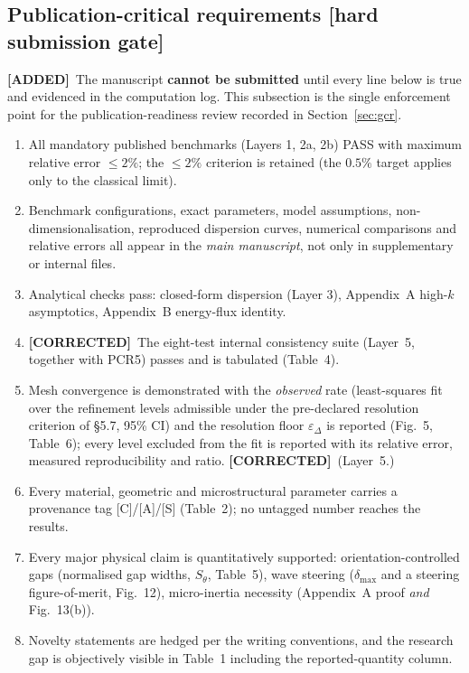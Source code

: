 \documentclass[11pt,a4paper]{article}
\newcommand{\bp}[1]{\textcolor{accent}{\textsf{\footnotesize [#1]}}}
\newcommand{\ADDED}{{\color{addcol}\textbf{[ADDED]}}}
\newcommand{\COR}{{\color{corcol}\textbf{[CORRECTED]}}}
\begin{document}
\subsection{Publication-critical requirements \bp{hard submission gate}}
\label{sec:pcr}

\ADDED\ The manuscript \textbf{cannot be submitted} until every line below is true and
evidenced in the computation log. This subsection is the single enforcement point for
the publication-readiness review recorded in Section~\ref{sec:gcr}.

\begin{enumerate}[label=\textbf{PCR\arabic*.}]
\item All mandatory published benchmarks (Layers 1, 2a, 2b) PASS with maximum relative
error $\le2\%$; the $\le2\%$ criterion is retained (the $0.5\%$ target applies only to the
classical limit).
\item Benchmark configurations, exact parameters, model assumptions, non-dimensionalisation,
reproduced dispersion curves, numerical comparisons and relative errors all appear in the
\emph{main manuscript}, not only in supplementary or internal files.
\item Analytical checks pass: closed-form dispersion (Layer 3), Appendix~A high-$k$
asymptotics, Appendix~B energy-flux identity.
\item \COR\ The eight-test internal consistency suite (Layer~5, together with PCR5) passes and is tabulated (Table~4).
\item Mesh convergence is demonstrated with the \emph{observed} rate (least-squares fit over the refinement levels admissible under the pre-declared resolution criterion of \S5.7, 95\% CI) and the resolution floor $\varepsilon_\Delta$ is reported (Fig.~5, Table~6); every level excluded from the fit is reported with its relative error, measured reproducibility and ratio. \COR\ (Layer~5.)
\item Every material, geometric and microstructural parameter carries a provenance tag
[C]/[A]/[S] (Table~2); no untagged number reaches the results.
\item Every major physical claim is quantitatively supported: orientation-controlled gaps
(normalised gap widths, $S_\theta$, Table~5), wave steering ($\delta_{\max}$ and a steering
figure-of-merit, Fig.~12), micro-inertia necessity (Appendix~A proof \emph{and} Fig.~13(b)).
\item Novelty statements are hedged per the writing conventions, and the research gap is
objectively visible in Table~1 including the reported-quantity column.
\end{enumerate}
\end{document}
